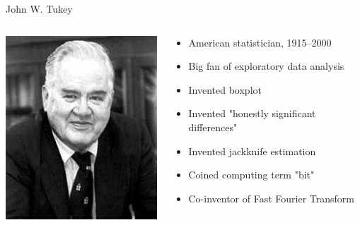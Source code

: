 \documentclass[
  ignorenonframetext,
]{beamer}
\begin{document}
\begin{frame}{John W. Tukey}
\protect\hypertarget{john-w.-tukey}{}

\begin{columns}
    \begin{column}{0.4\textwidth}
      \includegraphics[width=\textwidth]{John_Tukey}
    \end{column}
    \begin{column}{0.6\textwidth}
      \begin{itemize}
      \item American statistician, 1915--2000
      \item Big fan of exploratory data analysis
      \item Invented boxplot
      \item Invented "honestly significant differences"
      \item Invented jackknife estimation
      \item Coined computing term "bit"
      \item Co-inventor of Fast Fourier Transform
      \end{itemize}
    \end{column}
  \end{columns}

\end{frame}
\end{document}
